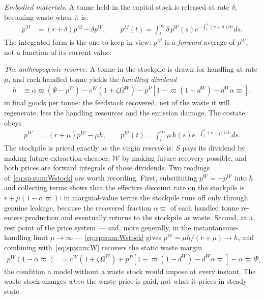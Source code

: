 \emph{Embodied materials.} A tonne held in the capital stock is released at rate $\delta$, becoming waste when it is:
\begin{align}
\dot p^M &= \left(r+\delta\right)p^M-\delta p^W,
\qquad
p^M\left(t\right)=\int_t^\infty\delta\,p^W\!\left(s\right)e^{-\int_t^s\left(r+\delta\right)d\tau}ds .
\label{eq:sp:sum:M}
\end{align}
The integrated form is the one to keep in view: $p^M$ is a \emph{forward} average of $p^W$, not a function of its current value.

\emph{The anthropogenic reserve.} A tonne in the stockpile is drawn for handling at rate $\mu$, and each handled tonne yields the \emph{handling dividend}
\begin{align}
h &\equiv \alpha\varpi\left(\Psi-p^W\right)-c^W\left(1+\zeta\Omega^W\right)-p^P\left[1-\varpi\left(1-d^W\right)-d^W\alpha\varpi\right],
\label{eq:sp:sum:h}
\end{align}
in final goods per tonne: the feedstock recovered, net of the waste it will regenerate, less the handling resources and the emission damage. The costate obeys
\begin{align}
\dot p^{\mathcal W} &= \left(r+\mu\right)p^{\mathcal W}-\mu h,
\qquad
p^{\mathcal W}\left(t\right)=\int_t^\infty \mu\,h\!\left(s\right)e^{-\int_t^s\left(r+\mu\right)d\tau}ds .
\label{eq:sp:sum:Wstock}
\end{align}
The stockpile is priced exactly as the virgin reserve is: $S$ pays its dividend by making future extraction cheaper, $\mathcal W$ by making future recovery possible, and both prices are forward integrals of those dividends. Two readings of~\eqref{eq:sp:sum:Wstock} are worth recording. First, substituting $p^W=-p^{\mathcal W}$ into $h$ and collecting terms shows that the effective discount rate on the stockpile is $r+\mu\left(1-\alpha\varpi\right)$: in marginal-value terms the stockpile runs off only through genuine leakage, because the recovered fraction $\alpha\varpi$ of each handled tonne re-enters production and eventually returns to the stockpile as waste. Second, at a rest point of the price system --- and, more generally, in the instantaneous-handling limit $\mu\to\infty$ --- \eqref{eq:sp:sum:Wstock} gives $p^{\mathcal W}=\mu h/\left(r+\mu\right)\to h$, and combining with~\eqref{eq:sp:sum:W} recovers the static waste margin
\begin{align}
p^W\left(1-\alpha\varpi\right) &= c^W\left(1+\zeta\Omega^W\right)+p^P\left[1-\varpi\left(1-d^W\right)-d^W\alpha\varpi\right]-\alpha\varpi\,\Psi ,
\label{eq:sp:sum:W-limit}
\end{align}
the condition a model without a waste stock would impose at every instant. The waste stock changes \emph{when} the waste price is paid, not what it prices in steady state.

